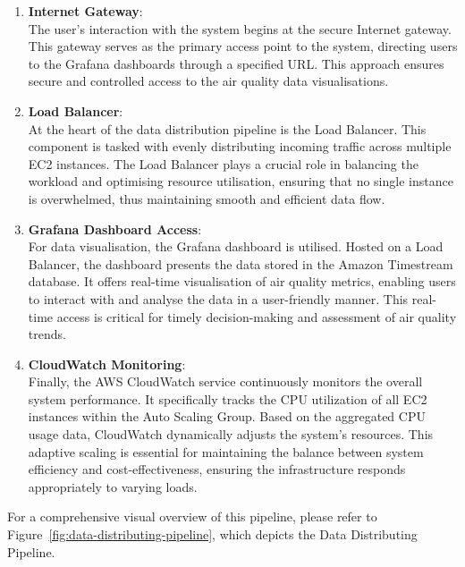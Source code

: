 \documentclass[12pt,oneside]{book} %
\begin{document}
\begin{enumerate}
    \item \textbf{Internet Gateway}: \\
          The user's interaction with the system begins at the secure Internet gateway. This gateway serves as the primary access point to the system, directing users to the Grafana dashboards through a specified URL. This approach ensures secure and controlled access to the air quality data visualisations.

    \item \textbf{Load Balancer}: \\
          At the heart of the data distribution pipeline is the Load Balancer. This component is tasked with evenly distributing incoming traffic across multiple EC2 instances. The Load Balancer plays a crucial role in balancing the workload and optimising resource utilisation, ensuring that no single instance is overwhelmed, thus maintaining smooth and efficient data flow.

    \item \textbf{Grafana Dashboard Access}: \\
          For data visualisation, the Grafana dashboard is utilised. Hosted on a Load Balancer, the dashboard presents the data stored in the Amazon Timestream database. It offers real-time visualisation of air quality metrics, enabling users to interact with and analyse the data in a user-friendly manner. This real-time access is critical for timely decision-making and assessment of air quality trends.
    \item \textbf{CloudWatch Monitoring}: \\
          Finally, the AWS CloudWatch service continuously monitors the overall system performance. It specifically tracks the CPU utilization of all EC2 instances within the Auto Scaling Group. Based on the aggregated CPU usage data, CloudWatch dynamically adjusts the system's resources. This adaptive scaling is essential for maintaining the balance between system efficiency and cost-effectiveness, ensuring the infrastructure responds appropriately to varying loads.
\end{enumerate}

For a comprehensive visual overview of this pipeline, please refer to
Figure~\ref{fig:data-distributing-pipeline}, which depicts the Data
Distributing Pipeline.
\end{document}
